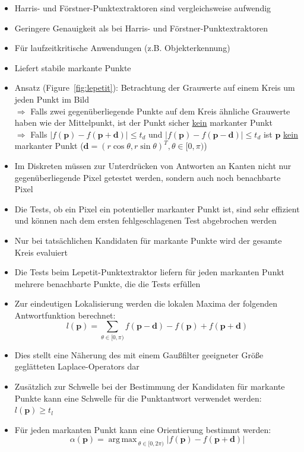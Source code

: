 \documentclass[11pt]{article}
\DeclareMathOperator*{\argmax}{arg\,max\,} %
\begin{document}
\begin{itemize}
    \item Harris- und Förstner-Punktextraktoren sind vergleichsweise aufwendig
    \item Geringere Genauigkeit als bei Harris- und Förstner-Punktextraktoren
    \item Für laufzeitkritische Anwendungen (z.B. Objekterkennung)
    \item Liefert stabile markante Punkte
    \item Ansatz (Figure~\ref{fig:lepetit}): Betrachtung der Grauwerte auf einem Kreis um jeden Punkt im Bild \\ $\Rightarrow$ Falls zwei gegenüberliegende Punkte auf dem Kreis ähnliche Grauwerte haben wie der Mittelpunkt, ist der Punkt sicher \underline{kein} markanter Punkt \\ $\Rightarrow$ Falls $\vert f(\boldsymbol{p}) - f(\boldsymbol{p} + \boldsymbol{d}) \vert \leq t_d$ und $\vert f(\boldsymbol{p}) - f(\boldsymbol{p} - \boldsymbol{d}) \vert \leq t_d$ ist $\boldsymbol{p}$ \underline{kein} markanter Punkt ($\boldsymbol{d} = (r \cos \theta, r \sin \theta)^T, \theta \in [0, \pi)$)
    \item Im Diskreten müssen zur Unterdrücken von Antworten an Kanten nicht nur gegenüberliegende Pixel getestet werden, sondern auch noch benachbarte Pixel
    \item Die Tests, ob ein Pixel ein potentieller markanter Punkt ist, sind sehr effizient und können nach dem ersten fehlgeschlagenen Test abgebrochen werden
    \item Nur bei tatsächlichen Kandidaten für markante Punkte wird der gesamte Kreis evaluiert
    \item Die Tests beim Lepetit-Punktextraktor liefern für jeden markanten Punkt mehrere benachbarte Punkte, die die Tests erfüllen
    \item Zur eindeutigen Lokalisierung werden die lokalen Maxima der folgenden Antwortfunktion berechnet: $$l(\boldsymbol{p}) = \sum_{\theta \in [0, \pi)} f(\boldsymbol{p} - \boldsymbol{d}) - f(\boldsymbol{p}) + f(\boldsymbol{p} + \boldsymbol{d})$$
    \item Dies stellt eine Näherung des mit einem Gaußfilter geeigneter Größe geglätteten Laplace-Operators dar
    \item Zusätzlich zur Schwelle bei der Bestimmung der Kandidaten für markante Punkte kann eine Schwelle für die Punktantwort verwendet werden: $l(\boldsymbol{p}) \ge t_l$
    \item Für jeden markanten Punkt kann eine Orientierung bestimmt werden: $$\alpha(\boldsymbol{p}) = \argmax_{\theta \in [0, 2\pi)} \vert f(\boldsymbol{p}) - f(\boldsymbol{p} + \boldsymbol{d})\vert$$
\end{itemize}
\end{document}
